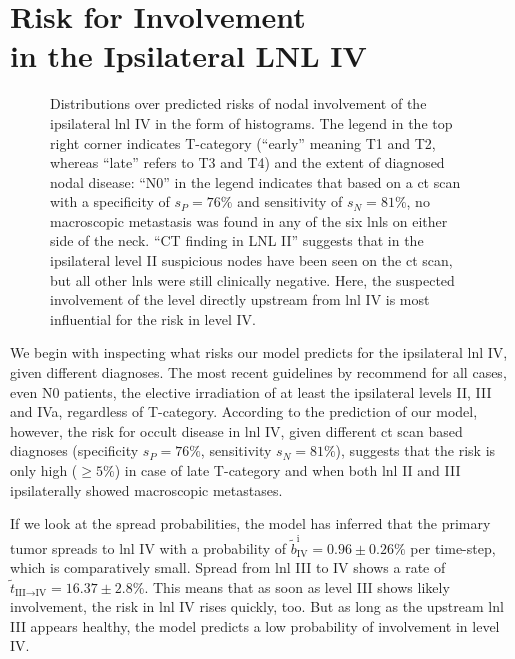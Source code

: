 \documentclass[\relativeRoot/main.tex]{subfiles}
\begin{document}
\section[Risk for Involvement in the Ipsilateral LNL IV]{Risk for Involvement\\in the Ipsilateral LNL IV}
\label{sec:complete:ipsiIV}

\begin{figure}
    \centering
    \def\svgwidth{1.0\textwidth}
    
    \caption[]{
        Distributions over predicted risks of nodal involvement of the ipsilateral \gls{lnl} IV in the form of histograms. The legend in the top right corner indicates T-category (``early'' meaning T1 and T2, whereas ``late'' refers to T3 and T4) and the extent of diagnosed nodal disease: ``N0'' in the legend indicates that based on a \gls{ct} scan with a specificity of $s_P = 76\%$ and sensitivity of $s_N = 81\%$, no macroscopic metastasis was found in any of the six \glspl{lnl} on either side of the neck. ``CT finding in LNL II'' suggests that in the ipsilateral level II suspicious nodes have been seen on the \gls{ct} scan, but all other \glspl{lnl} were still clinically negative. Here, the suspected involvement of the level directly upstream from \gls{lnl} IV is most influential for the risk in level IV.
    }
\end{figure}

We begin with inspecting what risks our model predicts for the ipsilateral \gls{lnl} IV, given different diagnoses. The most recent guidelines by  recommend for all cases, even N0 patients, the elective irradiation of at least the ipsilateral levels II, III and IVa, regardless of T-category. According to the prediction of our model, however, the risk for occult disease in \gls{lnl} IV, given different \gls{ct} scan based diagnoses (specificity $s_P = 76\%$, sensitivity $s_N = 81\%$), suggests that the risk is only high ($\geq 5\%$) in case of late T-category and when both \gls{lnl} II and III ipsilaterally showed macroscopic metastases.

If we look at the spread probabilities, the model has inferred that the primary tumor spreads to \gls{lnl} IV with a probability of $\tilde{b}_\text{IV}^\text{i} = 0.96 \pm 0.26 \%$ per time-step, which is comparatively small. Spread from \gls{lnl} III to IV shows a rate of $\tilde{t}_{\text{III}\rightarrow\text{IV}} = 16.37 \pm 2.8 \%$. This means that as soon as level III shows likely involvement, the risk in \gls{lnl} IV rises quickly, too. But as long as the upstream \gls{lnl} III appears healthy, the model predicts a low probability of involvement in level IV.
\end{document}
